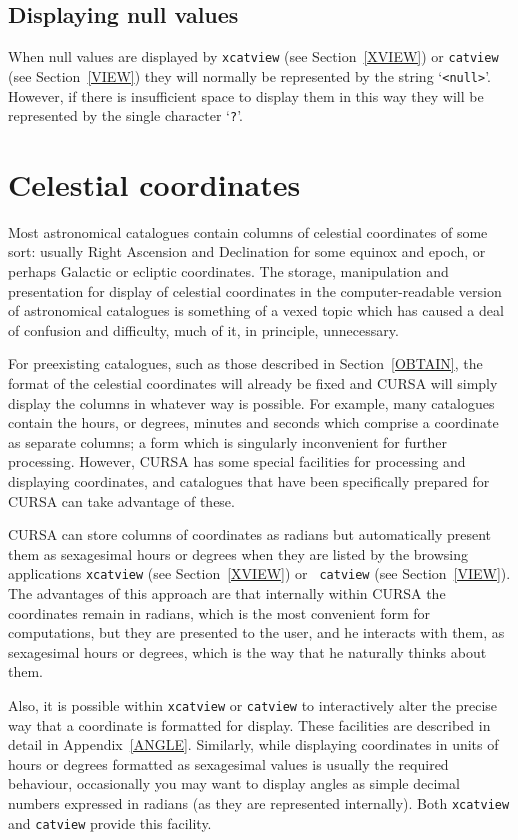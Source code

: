 \documentclass[twoside,11pt]{article}
\newcommand{\xlabel}[1]{}
\renewcommand{\_}{\texttt{\symbol{95}}}
\begin{document}
\subsection{Displaying null values}

When null values are displayed by {\tt xcatview} (see
Section~\ref{XVIEW}) or {\tt catview} (see Section~\ref{VIEW}) they
will normally be represented by the string `{\tt <null>}'. However, if
there is insufficient space to display them in this way they will be
represented by the single character `{\tt ?}'.


\section{\xlabel{CELCOORD}\label{CELCOORD}Celestial coordinates}

Most astronomical catalogues contain columns of celestial 
coordinates of some sort: usually Right Ascension and 
Declination for some equinox and epoch, or perhaps Galactic or 
ecliptic coordinates. The storage, manipulation and presentation 
for display of celestial coordinates in the computer-readable 
version of astronomical catalogues is something of a vexed topic 
which has caused a deal of confusion and difficulty, much of it, 
in principle, unnecessary.

For preexisting catalogues, such as those described in
Section~\ref{OBTAIN}, the format of the celestial 
coordinates will already be fixed and CURSA will simply display the
columns in whatever way is possible. For example, many catalogues 
contain the hours, or degrees, minutes and seconds which 
comprise a coordinate as separate columns; a form which is 
singularly inconvenient for further processing. However, CURSA has 
some special facilities for processing and displaying coordinates, and
catalogues that have been specifically prepared for CURSA can take
advantage of these.

CURSA can store columns of coordinates as radians but automatically
present them as sexagesimal hours or degrees when they are listed by the
browsing applications {\tt xcatview} (see Section~\ref{XVIEW}) or {\tt
catview} (see Section~\ref{VIEW}). The advantages of this approach are
that internally within CURSA the coordinates remain in radians, which is 
the most convenient form for computations, but they are presented to the
user, and he interacts with them, as sexagesimal hours or degrees, which
is the way that he naturally thinks about them.

Also, it is possible within {\tt xcatview} or {\tt catview} to
interactively alter the precise way that a coordinate is formatted for
display. These facilities are described in detail in
Appendix~\ref{ANGLE}. Similarly, while displaying coordinates in units of 
hours or degrees formatted as sexagesimal values is usually the required 
behaviour, occasionally you may want to display angles as simple decimal 
numbers expressed in radians (as they are represented internally). Both
{\tt xcatview} and {\tt catview} provide this facility. 
\end{document}
